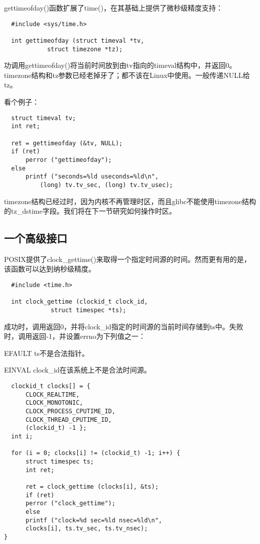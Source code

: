 gettimeofday()函数扩展了time()，在其基础上提供了微秒级精度支持： 

\begin{lstlisting}
  #include <sys/time.h>

  int gettimeofday (struct timeval *tv,
		    struct timezone *tz);
\end{lstlisting}

功调用gettimeofday()将当前时间放到由tv指向的timeval结构中，并返回0。timezone结构和tz参数已经老掉牙了；都不该在Linux中使用。一般传递NULL给tz。 

看个例子： 

\begin{lstlisting}
  struct timeval tv;
  int ret;

  ret = gettimeofday (&tv, NULL);
  if (ret)
      perror ("gettimeofday");
  else
      printf ("seconds=%ld useconds=%ld\n",
	      (long) tv.tv_sec, (long) tv.tv_usec);
\end{lstlisting}

timezone结构已经过时，因为内核不再管理时区，而且glibc不能使用timezone结构的tz\_dstime字段。我们将在下一节研究如何操作时区。 

\subsection{一个高级接口}

POSIX提供了clock\_gettime()来取得一个指定时间源的时间。然而更有用的是，该函数可以达到纳秒级精度。 

\begin{lstlisting}
  #include <time.h>

  int clock_gettime (clockid_t clock_id,
		     struct timespec *ts);
\end{lstlisting}

成功时，调用返回0，并将clock\_id指定的时间源的当前时间存储到ts中。失败时，调用返回-1，并设置errno为下列值之一： 

\begin{eqlist*}
\item [EFAULT]
ts不是合法指针。 
\item [EINVAL]
clock\_id在该系统上不是合法时间源。 
\end{eqlist*}

\begin{lstlisting}
  clockid_t clocks[] = {
      CLOCK_REALTIME,
      CLOCK_MONOTONIC,
      CLOCK_PROCESS_CPUTIME_ID,
      CLOCK_THREAD_CPUTIME_ID,
      (clockid_t) -1 };
  int i;

  for (i = 0; clocks[i] != (clockid_t) -1; i++) {
      struct timespec ts;
      int ret;
	
      ret = clock_gettime (clocks[i], &ts);
      if (ret)
	  perror ("clock_gettime");
      else
	  printf ("clock=%d sec=%ld nsec=%ld\n",
      clocks[i], ts.tv_sec, ts.tv_nsec);
}

\end{lstlisting}

